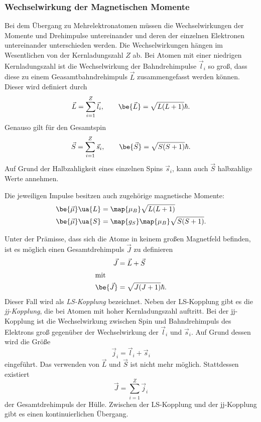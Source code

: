 \subsubsection{Wechselwirkung der Magnetischen Momente}

Bei dem Übergang zu Mehrelektronatomen müssen die Wechselwirkungen der Momente und Drehimpulse untereinander und
deren der einzelnen Elektronen untereinander unterschieden werden. Die Wechselwirkungen hängen im Wesentlichen
von der Kernladungszahl $Z$ ab.
Bei Atomen mit einer niedrigen Kernladungszahl ist die Wechselwirkung der Bahndrehimpulse $\vec{l}_i$ so groß, dass diese zu einem
Geasamtbahndrehimpuls $\vec{L}$ zusammengefasst werden können. Dieser wird definiert durch
\begin{equation*}
  \vec{L}=\sum_{i=1}^{Z} \vec{l}_i, \qquad \be{\vec{L}}=\sqrt{L(L+1)}\hbar.
\end{equation*}
Genauso gilt für den Gesamtspin
\begin{equation*}
  \vec{S}=\sum_{i=1}^{Z} \vec{s}_i, \qquad \be{\vec{S}}=\sqrt{S(S+1)}\hbar.
\end{equation*}
Auf Grund der Halbzahligkeit eines einzelnen Spins $\vec{s}_i$, kann auch $\vec{S}$ halbzahlige Werte annehmen.

Die jeweiligen Impulse besitzen auch zugehörige magnetische Momente:
\begin{align*}
  \be{\vec{\mu}}\ua{L}&=\map{\mu_B}\sqrt{L(L+1)}\\
  \be{\vec{\mu}}\ua{S}&=\map{g_S}\map{\mu_B}\sqrt{S(S+1)}.
\end{align*}

Unter der Prämisse, dass sich die Atome in keinem großen Magnetfeld befinden, ist es möglich einen Gesamtdrehimpuls $\vec{J}$ zu
definieren
\begin{align*}
  \vec{J}&=\vec{L}+\vec{S}\\
\shortintertext{mit}
\be{\vec{J}}&=\sqrt{J(J+1)}\hbar.
\end{align*}
Dieser Fall wird als \emph{LS-Kopplung} bezeichnet.
Neben der LS-Kopplung gibt es die \emph{jj-Kopplung}, die bei Atomen mit hoher Kernladungszahl auftritt.
Bei der jj-Kopplung ist die Wechselwirkung zwischen Spin und Bahndrehimpuls des Elektrons groß gegenüber der Wechselwirkung der $\vec{l}_i$ und
$\vec{s}_i$. Auf Grund dessen wird die Größe
\begin{equation*}
  \vec{j}_i=  \vec{l}_i+  \vec{s}_i
\end{equation*}
eingeführt. Das verwenden von $\vec{L}$ und $\vec{S}$ ist nicht mehr möglich.
Stattdessen existiert
\begin{equation*}
  \vec{J}=\sum_{i=1}^{Z} \vec{j}_i
\end{equation*}
der Gesamtdrehimpuls der Hülle.
Zwischen der LS-Kopplung und der jj-Kopplung gibt es einen kontinuierlichen Übergang.

